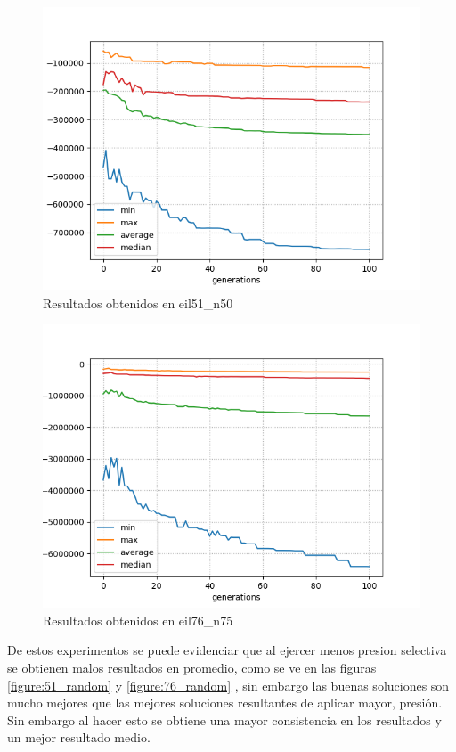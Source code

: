 \documentclass[twocolumn]{IEEEtran}
\begin{document}
\begin{figure}[htbp!]
    \centering
    \includegraphics[width=\linewidth]{figures/TTP_eil51_n50_tournament.png}
    \caption{Resultados obtenidos en eil51\_n50}
    \label{figure:51_torneum}
\end{figure}

\begin{figure}[htbp!]
    \centering
    \includegraphics[width=\linewidth]{figures/ttp_eil76_tournament.png}
    \caption{Resultados obtenidos en eil76\_n75}
    \label{figure:76_torneum}
\end{figure}

De estos experimentos se puede evidenciar que al ejercer menos presion selectiva se obtienen
malos resultados en promedio, como se ve en las figuras \ref{figure:51_random} y \ref{figure:76_random}
, sin embargo las 
buenas soluciones son mucho mejores que las mejores soluciones resultantes de aplicar mayor,
presión. Sin embargo al hacer esto se obtiene una mayor consistencia en los resultados y un 
mejor resultado medio.
\end{document}
